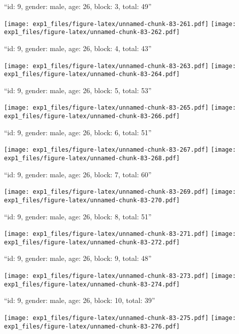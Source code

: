 \documentclass[11pt,,]{article}
\begin{document}
\newpage
[1] 

``id: 9, gender: male, age: 26, block: 3, total: 49''

\texttt{[image: exp1\_files/figure-latex/unnamed-chunk-83-261.pdf]}
\texttt{[image: exp1\_files/figure-latex/unnamed-chunk-83-262.pdf]}

\newpage
[1] 

``id: 9, gender: male, age: 26, block: 4, total: 43''

\texttt{[image: exp1\_files/figure-latex/unnamed-chunk-83-263.pdf]}
\texttt{[image: exp1\_files/figure-latex/unnamed-chunk-83-264.pdf]}

\newpage
[1] 

``id: 9, gender: male, age: 26, block: 5, total: 53''

\texttt{[image: exp1\_files/figure-latex/unnamed-chunk-83-265.pdf]}
\texttt{[image: exp1\_files/figure-latex/unnamed-chunk-83-266.pdf]}

\newpage
[1] 

``id: 9, gender: male, age: 26, block: 6, total: 51''

\texttt{[image: exp1\_files/figure-latex/unnamed-chunk-83-267.pdf]}
\texttt{[image: exp1\_files/figure-latex/unnamed-chunk-83-268.pdf]}

\newpage
[1] 

``id: 9, gender: male, age: 26, block: 7, total: 60''

\texttt{[image: exp1\_files/figure-latex/unnamed-chunk-83-269.pdf]}
\texttt{[image: exp1\_files/figure-latex/unnamed-chunk-83-270.pdf]}

\newpage
[1] 

``id: 9, gender: male, age: 26, block: 8, total: 51''

\texttt{[image: exp1\_files/figure-latex/unnamed-chunk-83-271.pdf]}
\texttt{[image: exp1\_files/figure-latex/unnamed-chunk-83-272.pdf]}

\newpage
[1] 

``id: 9, gender: male, age: 26, block: 9, total: 48''

\texttt{[image: exp1\_files/figure-latex/unnamed-chunk-83-273.pdf]}
\texttt{[image: exp1\_files/figure-latex/unnamed-chunk-83-274.pdf]}

\newpage
[1] 

``id: 9, gender: male, age: 26, block: 10, total: 39''

\texttt{[image: exp1\_files/figure-latex/unnamed-chunk-83-275.pdf]}
\texttt{[image: exp1\_files/figure-latex/unnamed-chunk-83-276.pdf]}
\end{document}
